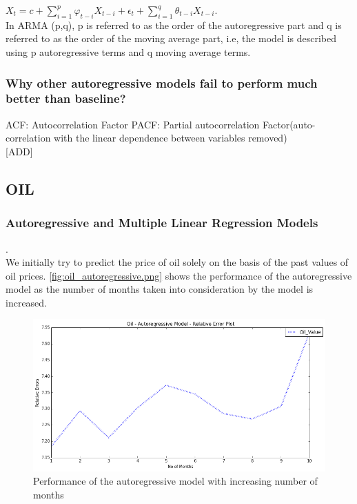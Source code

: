\documentclass[runningheads]{llncs}
\begin{document}
$ X_{t} = c + \sum\limits_{i=1}^p \varphi_{t-i}X_{t-i} + \epsilon_{t} + \sum\limits_{i=1}^q \theta_{t-i}X_{t-i}$.\\

In ARMA (p,q), p is referred to as the order of the autoregressive part and q is referred to as the order of the moving average part, i.e, the model is described using p autoregressive terms and q moving average terms.\\ 

\subsubsection {Why other autoregressive models fail to perform much better than baseline?}
ACF: Autocorrelation Factor
PACF: Partial autocorrelation Factor(auto-correlation with the linear dependence between variables removed)
\\

[ADD]
\subsection {OIL}

\subsubsection {Autoregressive and Multiple Linear Regression Models}.\\

We initially try to predict the price of oil solely on the basis of the past values of oil prices. \autoref{fig:oil_autoregressive.png} shows the performance of the autoregressive model as the number of months taken into consideration by the model is increased. \\

\begin{figure}
\centering
\includegraphics[width=\textwidth]{oil_autoregressive.png}
\caption{Performance of the autoregressive model with increasing number of months}
\label{fig:oil_autoregressive.png}
\end{figure}
\end{document}
